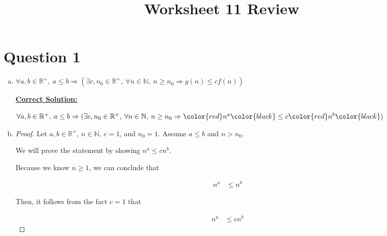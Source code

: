 \documentclass[12pt]{article}
\begin{document}
\title{Worksheet 11 Review}
\maketitle

\section*{Question 1}
\begin{enumerate}[a.]
    \item

    $\forall a,b \in \mathbb{R}^{+},\: a \leq b \Rightarrow (\exists c,n_0 \in
    \mathbb{R}^{+},\:\forall n \in \mathbb{N},\:n \geq n_0 \Rightarrow g(n) \leq cf(n))$

    \begin{mdframed}
        \underline{\textbf{Correct Solution:}}

        \bigskip

        $\forall a,b \in \mathbb{R}^{+},\: a \leq b \Rightarrow (\exists c,n_0 \in
        \mathbb{R}^{+},\:\forall n \in \mathbb{N},\:n \geq n_0 \Rightarrow
        \color{red} n^a \color{black} \leq c\color{red} n^b \color{black})$

    \end{mdframed}

    \item

    \begin{proof}
        Let $a,b \in \mathbb{R}^{+}$, $n \in \mathbb{N}$, $c = 1$, and $n_0 = 1$. Assume
        $a \leq b$ and $n > n_0$.

        \bigskip

        We will prove the statement by showing $n^a \leq cn^b$.

        \bigskip

        Because we know $n \geq 1$, we can conclude that

        \begin{align}
            n^a &\leq n^b
        \end{align}

        \bigskip

        Then, it follows from the fact $c = 1$ that

        \begin{align}
            n^a &\leq cn^b
        \end{align}

    \end{proof}


\end{enumerate}
\end{document}
